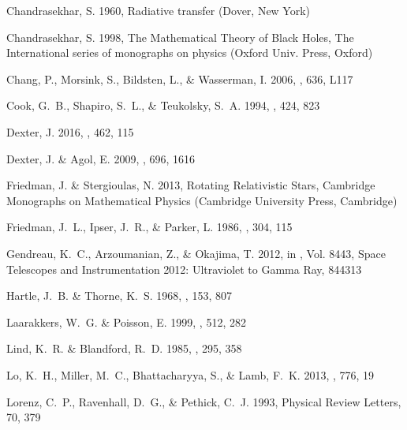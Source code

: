 \documentclass{aa}
\begin{document}
\begin{thebibliography}{55}
{Chandrasekhar}, S. 1960, {Radiative transfer} (Dover, New York)

Chandrasekhar, S. 1998, The Mathematical Theory of Black Holes, The International series of monographs on physics (Oxford Univ. Press, Oxford)

{Chang}, P., {Morsink}, S., {Bildsten}, L., \& {Wasserman}, I. 2006, \apjl,
  636, L117

{Cook}, G.~B., {Shapiro}, S.~L., \& {Teukolsky}, S.~A. 1994, \apj, 424, 823

{Dexter}, J. 2016, \mnras, 462, 115

{Dexter}, J. \& {Agol}, E. 2009, \apj, 696, 1616

Friedman, J. \& Stergioulas, N. 2013, Rotating Relativistic Stars, Cambridge
  Monographs on Mathematical Physics (Cambridge University Press, Cambridge)

{Friedman}, J.~L., {Ipser}, J.~R., \& {Parker}, L. 1986, \apj, 304, 115

{Gendreau}, K.~C., {Arzoumanian}, Z., \& {Okajima}, T. 2012, in \procspie, Vol.
  8443, Space Telescopes and Instrumentation 2012: Ultraviolet to Gamma Ray,
  844313

{Hartle}, J.~B. \& {Thorne}, K.~S. 1968, \apj, 153, 807

{Laarakkers}, W.~G. \& {Poisson}, E. 1999, \apj, 512, 282

{Lind}, K.~R. \& {Blandford}, R.~D. 1985, \apj, 295, 358

{Lo}, K.~H., {Miller}, M.~C., {Bhattacharyya}, S., \& {Lamb}, F.~K. 2013, \apj,
  776, 19

{Lorenz}, C.~P., {Ravenhall}, D.~G., \& {Pethick}, C.~J. 1993, Physical Review
  Letters, 70, 379


\end{thebibliography}
\end{document}
